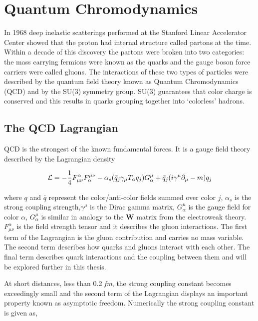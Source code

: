 
\chapter{Quantum Chromodynamics} \label{ch:qcd}
In 1968 deep inelastic scatterings performed at the Stanford Linear Accelerator Center showed that the proton had internal structure\cite{Riordan1287} called partons at the time.  Within a decade of this discovery the partons were broken into two categories: the mass carrying fermions were known as the quarks and the gauge boson force carriers were called gluons.  The interactions of these two types of particles were described by the quantum field theory known as Quantum Chromodynamics (QCD) and by the SU(3) symmetry group.  SU(3) guarantees that color charge is conserved and this results in quarks grouping together into `colorless' hadrons.

\section{The QCD Lagrangian}
QCD is the strongest of the known fundamental forces.  It is a gauge field theory described by the Lagrangian density

\begin{equation}
{\cal L}=-\frac{1}{4}F^{\alpha}_{\mu\nu}F^{\mu\nu}_{\alpha}
- \alpha_{s} (\bar{q}_{j}\gamma_{\mu}T_{\alpha}q_{j})G_{\alpha}^{\mu}
+ \bar{q}_{j}(i\gamma^{\mu} \partial_{\mu} - m)q_{j}
\label{eq:lagrangian}
\end{equation}

\noindent
where $q$ and $\bar{q}$ represent the color/anti-color fields summed over color $j$, $\alpha_{s}$ is the strong coupling strength,$\gamma^{\mu}$ is the Dirac gamma matrix, $G_{\alpha}^{\mu}$ is the gauge field for color \textit{$\alpha$}, $G_{\alpha}^{\mu}$ is similar in analogy to the \textbf{W} matrix from the electroweak theory.  $F^{\alpha}_{\mu\nu}$ is the field strength tensor and it describes the gluon interactions. The first term of the Lagrangian is the gluon contribution and carries no mass variable.  The second term describes how quarks and gluons interact with each other. The final term describes quark interactions and the coupling between them and will be explored further in this thesis.

At short distances, less than 0.2 \textit{fm}, the strong coupling constant becomes exceedingly small and the second term of the Lagrangian displays an important property known as asymptotic freedom\cite{Wilczek:2005az}.  Numerically the strong coupling constant is given as,

